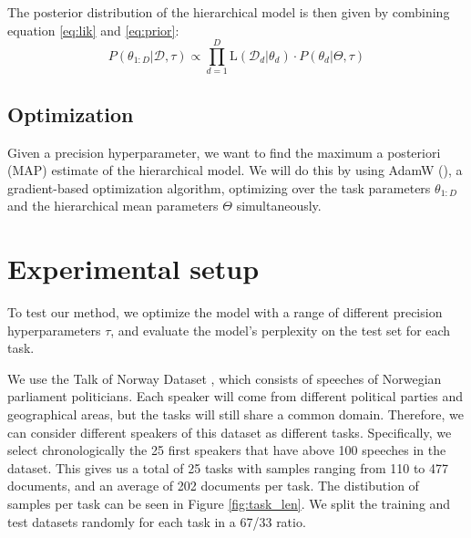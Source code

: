 \documentclass{article}
\begin{document}
The posterior distribution of the hierarchical model is then given by combining equation \ref{eq:lik} and \ref{eq:prior}:
\begin{equation} \label{eq:posterior}
    P(\theta_{1:D} | \mathcal{D}, \tau) \propto \prod_{d=1}^D \text{L}(\mathcal{D}_d | \theta_d) \cdot P(\theta_d | \Theta, \tau)
\end{equation}
%


\subsection{Optimization}
Given a precision hyperparameter, we want to find the maximum a posteriori (MAP) estimate of the hierarchical model. We will do this by using AdamW (\cite{adamW}), a gradient-based optimization algorithm, optimizing over the task parameters $\theta_{1:D}$ and the hierarchical mean parameters $\Theta$ simultaneously.

\section{Experimental setup}

To test our method, we optimize the model with a range of different precision hyperparameters $\tau$, and evaluate the model's perplexity on the test set for each task.


We use the Talk of Norway Dataset \cite{lapponi_talk_2018}, which consists of speeches of Norwegian parliament politicians. Each speaker will come from different political parties and geographical areas, but the tasks will still share a common domain. Therefore, we can consider different speakers of this dataset as different tasks. Specifically, we select chronologically the 25 first speakers that have above 100 speeches in the dataset.
This gives us a total of 25 tasks with samples ranging from 110 to 477 documents, and an average of 202 documents per task.
The distibution of samples per task can be seen in Figure \ref{fig:task_len}.
We split the training and test datasets randomly for each task in a 67/33 ratio.
\end{document}
